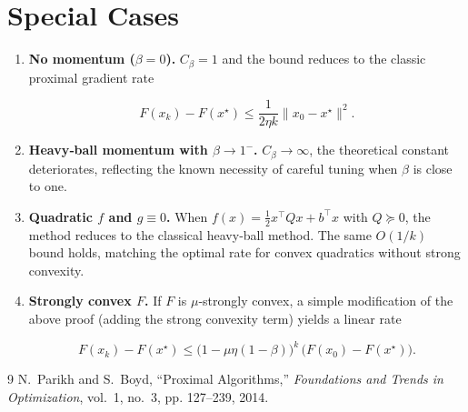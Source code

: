 \documentclass{article}
\begin{document}
\section*{Special Cases}
\begin{enumerate}[label=\alph*)]
\item \textbf{No momentum ($\beta=0$).}  $C_{\beta}=1$ and the bound reduces to the classic proximal gradient rate  

\[
F(x_{k})-F(x^{\star})\le\frac{1}{2\eta k}\|x_{0}-x^{\star}\|^{2}.
\]

\item \textbf{Heavy‑ball momentum with $\beta\to1^{-}$.}  $C_{\beta}\to\infty$, the theoretical constant deteriorates, reflecting the known necessity of careful tuning when $\beta$ is close to one.

\item \textbf{Quadratic $f$ and $g\equiv0$.}  When $f(x)=\frac{1}{2}x^{\top}Qx+b^{\top}x$ with $Q\succeq0$, the method reduces to the classical heavy‑ball method.  The same $O(1/k)$ bound holds, matching the optimal rate for convex quadratics without strong convexity.

\item \textbf{Strongly convex $F$.}  If $F$ is $\mu$‑strongly convex, a simple modification of the above proof (adding the strong convexity term) yields a linear rate  

\[
F(x_{k})-F(x^{\star})\le\big(1-\mu\eta(1-\beta)\big)^{k}\,
\big(F(x_{0})-F(x^{\star})\big).
\]

\end{enumerate}

\begin{thebibliography}{9}
N.~Parikh and S.~Boyd, ``Proximal Algorithms,'' \emph{Foundations and Trends in Optimization}, vol.~1, no.~3, pp. 127–239, 2014.
\end{thebibliography}
\end{document}
